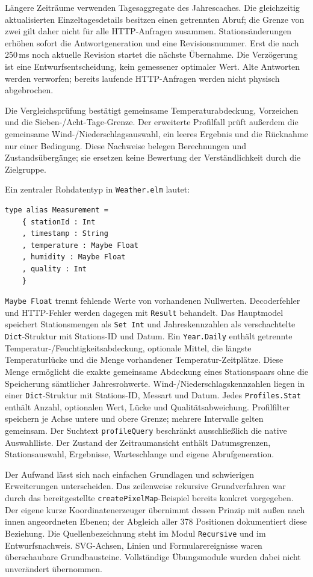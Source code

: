 \documentclass[usegeometry=true]{scrartcl}
\begin{document}
Längere Zeiträume verwenden Tagesaggregate des Jahrescaches. Die
gleichzeitig aktualisierten Einzeltagesdetails besitzen einen getrennten
Abruf; die Grenze von zwei gilt daher nicht für alle HTTP-Anfragen
zusammen. Stationsänderungen erhöhen sofort die Antwortgeneration und
eine Revisionsnummer. Erst die nach 250\,ms noch aktuelle Revision startet
die nächste Übernahme. Die Verzögerung ist eine Entwurfsentscheidung,
kein gemessener optimaler Wert. Alte Antworten werden verworfen; bereits
laufende HTTP-Anfragen werden nicht physisch abgebrochen.

Die Vergleichsprüfung bestätigt gemeinsame Temperaturabdeckung,
Vorzeichen und die Sieben-/Acht-Tage-Grenze. Der erweiterte Profilfall
prüft außerdem die gemeinsame Wind-/Niederschlagsauswahl, ein leeres
Ergebnis und die Rücknahme nur einer Bedingung. Diese Nachweise belegen
Berechnungen und Zustandsübergänge; sie ersetzen keine Bewertung der
Verständlichkeit durch die Zielgruppe.

Ein zentraler Rohdatentyp in \texttt{Weather.elm} lautet:
\begin{verbatim}
type alias Measurement =
    { stationId : Int
    , timestamp : String
    , temperature : Maybe Float
    , humidity : Maybe Float
    , quality : Int
    }
\end{verbatim}
\texttt{Maybe Float} trennt fehlende Werte von vorhandenen Nullwerten.
Decoderfehler und HTTP-Fehler werden dagegen mit \texttt{Result}
behandelt. Das Hauptmodel speichert Stationsmengen als \texttt{Set Int}
und Jahreskennzahlen als verschachtelte \texttt{Dict}-Struktur mit
Stations-ID und Datum. Ein \texttt{Year.Daily} enthält getrennte
Temperatur-/Feuchtigkeitsabdeckung, optionale Mittel, die längste
Temperaturlücke und die Menge vorhandener Temperatur-Zeitplätze.
Diese Menge ermöglicht die exakte gemeinsame Abdeckung eines
Stationspaars ohne die Speicherung sämtlicher Jahresrohwerte.
Wind-/Niederschlagskennzahlen liegen in einer \texttt{Dict}-Struktur mit
Stations-ID, Messart und Datum. Jedes \texttt{Profiles.Stat} enthält
Anzahl, optionalen Wert, Lücke und Qualitätsabweichung. Profilfilter
speichern je Achse untere und obere Grenze; mehrere Intervalle gelten
gemeinsam. Der Suchtext \texttt{profileQuery} beschränkt ausschließlich
die native Auswahlliste. Der Zustand der Zeitraumansicht enthält Datumsgrenzen,
Stationsauswahl, Ergebnisse, Warteschlange und eigene Abrufgeneration.

Der Aufwand lässt sich nach einfachen Grundlagen und schwierigen
Erweiterungen unterscheiden. Das zeilenweise rekursive Grundverfahren
war durch das bereitgestellte \texttt{createPixelMap}-Beispiel bereits
konkret vorgegeben. Der eigene kurze Koordinatenerzeuger übernimmt dessen
Prinzip mit außen nach innen angeordneten Ebenen; der Abgleich aller
378 Positionen dokumentiert diese Beziehung. Die Quellenbezeichnung
steht im Modul \texttt{Recursive} und im Entwurfsnachweis.
SVG-Achsen, Linien und Formularereignisse waren überschaubare
Grundbausteine. Vollständige Übungsmodule wurden dabei nicht unverändert übernommen.
\end{document}
